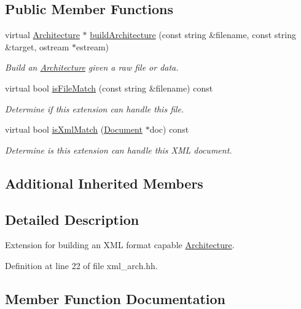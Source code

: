 \subsection*{Public Member Functions}
\begin{DoxyCompactItemize}
\item 
virtual \mbox{\hyperlink{class_architecture}{Architecture}} $\ast$ \mbox{\hyperlink{class_xml_architecture_capability_a3aedd28755471c050f539d7fcb9553f9}{build\+Architecture}} (const string \&filename, const string \&target, ostream $\ast$estream)
\begin{DoxyCompactList}\small\item\em Build an \mbox{\hyperlink{class_architecture}{Architecture}} given a raw file or data. \end{DoxyCompactList}\item 
virtual bool \mbox{\hyperlink{class_xml_architecture_capability_a90009c1feff64b66e29562b68b5f2a5a}{is\+File\+Match}} (const string \&filename) const
\begin{DoxyCompactList}\small\item\em Determine if this extension can handle this file. \end{DoxyCompactList}\item 
virtual bool \mbox{\hyperlink{class_xml_architecture_capability_ab834c8722ce6813e4b5cf34a207b0f52}{is\+Xml\+Match}} (\mbox{\hyperlink{class_document}{Document}} $\ast$doc) const
\begin{DoxyCompactList}\small\item\em Determine is this extension can handle this X\+ML document. \end{DoxyCompactList}\end{DoxyCompactItemize}
\subsection*{Additional Inherited Members}


\subsection{Detailed Description}
Extension for building an X\+ML format capable \mbox{\hyperlink{class_architecture}{Architecture}}. 

Definition at line 22 of file xml\+\_\+arch.\+hh.



\subsection{Member Function Documentation}
\mbox{\label{class_xml_architecture_capability_a3aedd28755471c050f539d7fcb9553f9}} 
